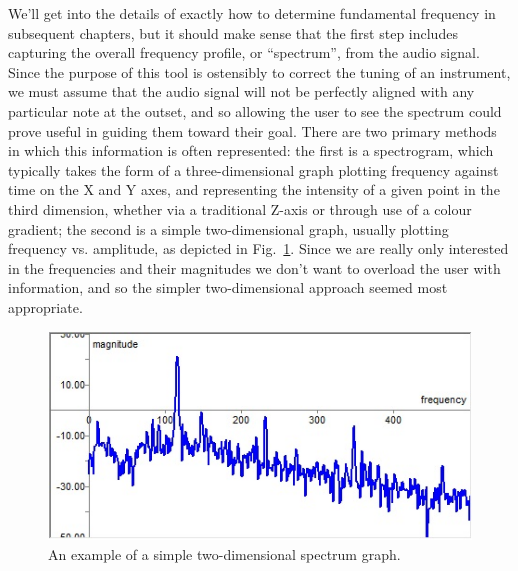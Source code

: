 \documentclass[12pt]{report}
\begin{document}
\indent We'll get into the details of exactly how to determine fundamental frequency in subsequent chapters, but it should make sense that the first step includes capturing the overall frequency profile, or ``spectrum'', from the audio signal. Since the purpose of this tool is ostensibly to correct the tuning of an instrument, we must assume that the audio signal will not be perfectly aligned with any particular note at the outset, and so allowing the user to see the spectrum could prove useful in guiding them toward their goal. There are two primary methods in which this information is often represented: the first is a spectrogram, which typically takes the form of a three-dimensional graph plotting frequency against time on the X and Y axes, and representing the intensity of a given point in the third dimension, whether via a traditional Z-axis or through use of a colour gradient; the second is a simple two-dimensional graph, usually plotting frequency vs. amplitude, as depicted in Fig.~\ref{fig:spectrum}. Since we are really only interested in the frequencies and their magnitudes we don't want to overload the user with information, and so the simpler two-dimensional approach seemed most appropriate.

\begin{figure}[!ht]
	\centering
	\includegraphics[width=120mm]{spectrum.jpg}
	\caption[Spectrum Graph]{An example of a simple two-dimensional spectrum graph.} 
	\label{fig:spectrum} 
\end{figure}
\end{document}
